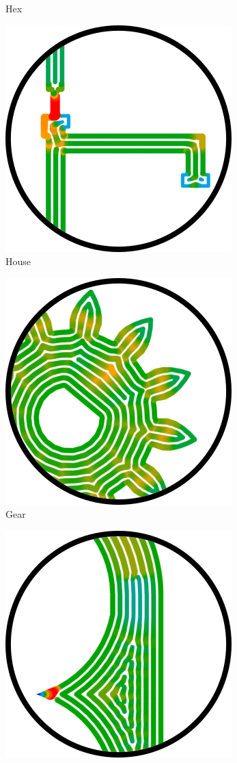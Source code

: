 \begin{figure}
\begin{subfigure}{\figwidth}
\caption{Hex}%
\end{subfigure}
\begin{subfigure}{\figwidth}\centering
\includegraphics[height=\figheight]{sources/applications/house.png}
\caption{House}%
\end{subfigure}
\begin{subfigure}{\figwidth}\centering
\includegraphics[height=\figheight]{sources/applications/pinion_gear_motor.png}
\caption{Gear}\label{applications_gear}
\end{subfigure}
\begin{subfigure}{\figwidth}\centering
\includegraphics[height=\figheight]{sources/applications/pocket_operator_case.png}

\end{subfigure}
\end{figure}
